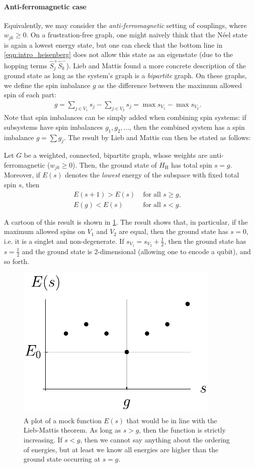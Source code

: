 \paragraph{Anti-ferromagnetic case} Equivalently, we may consider the \emph{anti-ferromagnetic} setting of couplings, where $w_{jk} \geq 0$. On a frustration-free graph, one might naively think that the N\'{e}el state is again a lowest energy state, but one can check that the bottom line in \cref{eqn:intro_heisenberg} does not allow this state as an eigenstate (due to the hopping terms $ \hat{S}^+_j \hat{S}^-_k $). Lieb and Mattis \cite{Lieb1962} found a more concrete description of the ground state as long as the system's graph is a \emph{bipartite} graph. On these graphs, we define the spin imbalance $g$ as the difference between the maximum allowed spin of each part: 
\begin{align}
g = \sum_{j \in V_1} s_j - \sum_{j \in V_2} s_j = \max s_{V_1} - \max s_{V_2}.
\label{eq:imbalance}
\end{align}
Note that spin imbalances can be simply added when combining spin systems: if subsystems have spin imbalances $g_1, g_2, \ldots$, then the combined system has a spin imbalance $g = \sum g_j$. The result by Lieb and Mattis can then be stated as follows:
%
\begin{theorem*}
Let $G$ be a weighted, connected, bipartite graph, whose weights are anti-ferromagnetic ($w_{jk} \geq 0$). Then, the ground state of $H_\text{H}$ has total spin $s  = g$. Moreover, if $E(s)$ denotes the \emph{lowest} energy of the subspace with fixed total spin $s$, then 
\begin{align*}
E(s+1) > E(s)  &\text{ for all } s \geq g, \\
E(g) < E(s)  &\text{ for all } s < g.
\end{align*}
\label{thm:LiebMattis}
\end{theorem*}
%
%
A cartoon of this result is shown in \cref{fig:energyPerStot}. The result shows that, in particular, if the maximum allowed spins on $V_1$ and $V_2$ are equal, then the ground state has $s = 0$, i.e. it is a singlet and non-degenerate. If  $s_{V_1} = s_{V_2} +\frac{1}{2}$, then the ground state has $s = \frac{1}{2}$ and the ground state is 2-dimensional (allowing one to encode a qubit), and so forth.

\begin{figure}
\centering
\includegraphics[width=.4\textwidth]{img/energyPerSBlack.pdf}
\caption{A plot of a mock function $E(s)$ that would be in line with the Lieb-Mattis theorem. As long as $s > g$, then the function is strictly increasing. If $s < g$, then we cannot say anything about the ordering of energies, but at least we know all energies are higher than the ground state occurring at $s = g$. }
\label{fig:energyPerStot}
\end{figure}

